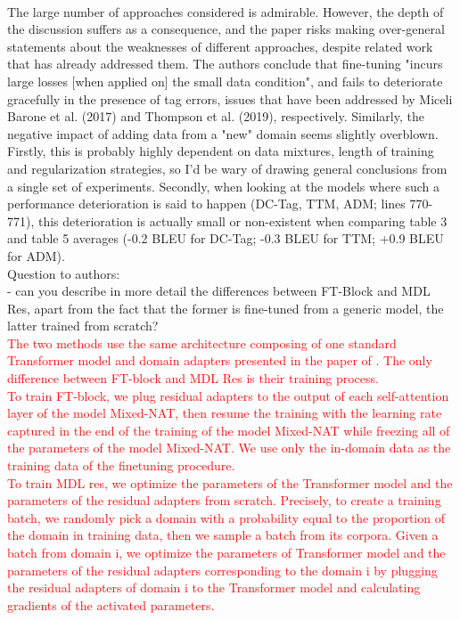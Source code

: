 \documentclass[12pt,times,a4paper,twoside]{article}
\theoremstyle{definition}
\begin{document}
\\
The large number of approaches considered is admirable. However, the depth of the discussion suffers as a consequence, and the paper risks making over-general statements about the weaknesses of different approaches, despite related work that has already addressed them. The authors conclude that fine-tuning "incurs large losses [when applied on] the small data condition", and fails to deteriorate gracefully in the presence of tag errors, issues that have been addressed by Miceli Barone et al. (2017) and Thompson et al. (2019), respectively. Similarly, the negative impact of adding data from a "new" domain seems slightly overblown. Firstly, this is probably highly dependent on data mixtures, length of training and regularization strategies, so I'd be wary of drawing general conclusions from a single set of experiments. Secondly, when looking at the models where such a performance deterioration is said to happen (DC-Tag, TTM, ADM; lines
770-771), this deterioration is actually small or non-existent when
comparing table 3 and table 5 averages (-0.2 BLEU for DC-Tag; -0.3 BLEU for TTM; +0.9 BLEU for ADM).
\\
Question to authors:
\\
- can you describe in more detail the differences between FT-Block and MDL Res, apart from the fact that the former is fine-tuned from a generic model, the latter trained from scratch?
\\
\textcolor{red}{The two methods use the same architecture composing of one standard Transformer model and domain adapters presented in the paper of \cite{Bapna19simple}. The only difference between FT-block and MDL Res is their training process.
\\
To train FT-block, we plug residual adapters to the output of each self-attention layer of the model Mixed-NAT, then resume the training with the learning rate captured in the end of the training of the model Mixed-NAT while freezing all of the parameters of the model Mixed-NAT. We use only the in-domain data as the training data of the finetuning procedure. 
\\
To train MDL res, we optimize the parameters of the Transformer model and the parameters of the residual adapters from scratch. Precisely, to create a training batch, we randomly pick a domain with a probability equal to the proportion of the domain in training data, then we sample a batch from its corpora. Given a batch from domain i, we optimize the parameters of Transformer model and the parameters of the residual adapters corresponding to the domain i by plugging the residual adapters of domain i to the Transformer model and calculating gradients of the activated parameters.}
\end{document}
